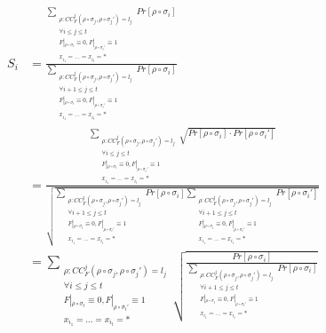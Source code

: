 \begin{align*}
    S_i &= \frac{
            \underset{\substack{\rho: CC_F^{j}(\rho\circ \sigma_j, \rho \circ \sigma_j')= l_j\\ \forall i\leq j \leq t\\ F|_{\rho\circ \sigma_t} \equiv 0, F|_{\rho\circ \sigma_t'}\equiv 1\\x_{i_1}=\ldots= x_{i_t} = *}} {\sum} Pr[\rho \circ \sigma_{i}]}
            {\underset{\substack{\rho: CC_F^{j}(\rho\circ \sigma_j, \rho \circ \sigma_j')= l_j\\ \forall i+1\leq j \leq t\\F|_{\rho\circ \sigma_t} \equiv 0, F|_{\rho\circ \sigma_t'}\equiv 1\\x_{i_{1}}=\ldots= x_{i_t} = *}} {\sum} Pr[\rho\circ \sigma_{i} ]}\\
            &=  \frac{\underset{\substack{\rho:             CC_F^{j}(\rho\circ \sigma_j, \rho \circ \sigma_j')= l_j\\ \forall i\leq j \leq t\\ F|_{\rho\circ \sigma_t} \equiv 0, F|_{\rho\circ \sigma_t'}\equiv 1\\x_{i_1}=\ldots= x_{i_t} = *}} {\sum}\sqrt{Pr[\rho \circ \sigma_{i}]\cdot Pr[\rho \circ \sigma_{i}']}}
            {\sqrt{
            \underset{\substack{\rho: CC_F^{j}(\rho\circ \sigma_j, \rho \circ \sigma_j')= l_j\\ \forall i+1\leq j \leq t\\F|_{\rho\circ \sigma_t} \equiv 0, F|_{\rho\circ \sigma_t'}\equiv 1\\x_{i_{1}}=\ldots= x_{i_t} = *}} {\sum} Pr[\rho\circ \sigma_{i} ] 
            \underset{\substack{\rho: CC_F^{j}(\rho\circ \sigma_j, \rho \circ \sigma_j')= l_j\\ \forall i+1\leq j \leq t\\F|_{\rho\circ \sigma_t} \equiv 0, F|_{\rho\circ \sigma_t'}\equiv 1\\x_{i_{1}}=\ldots= x_{i_t} = *}} {\sum} Pr[\rho\circ \sigma_{i}' ] }} \\
        &= 
            \underset{\substack{\rho: CC_F^{j}(\rho\circ \sigma_j, \rho \circ \sigma_j')= l_j\\ \forall i\leq j \leq t\\ F|_{\rho\circ \sigma_t} \equiv 0, F|_{\rho\circ \sigma_t'}\equiv 1\\x_{i_1}=\ldots= x_{i_t} = *}} {\sum}
            \sqrt{\frac{Pr[\rho \circ \sigma_{i}]}{\underset{\substack{\rho: CC_F^{j}(\rho\circ \sigma_j, \rho \circ \sigma_j')= l_j\\ \forall i+1\leq j \leq t\\F|_{\rho\circ \sigma_t} \equiv 0, F|_{\rho\circ \sigma_t'}\equiv 1\\x_{i_{1}}=\ldots= x_{i_t} = *}} {\sum} Pr[\rho\circ \sigma_{i} ]}}

\end{align*}
